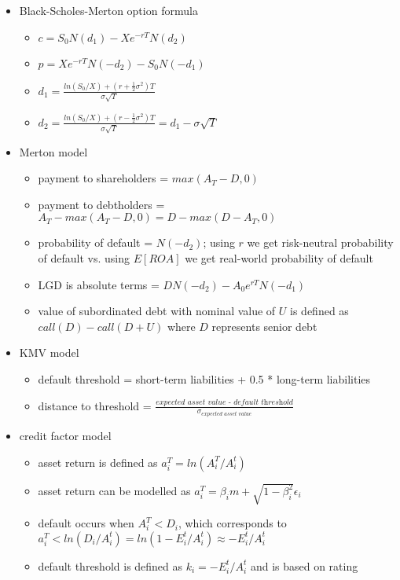 \begin{itemize}
	\item Black-Scholes-Merton option formula
	\begin{itemize}
		\item $c = S_0 N(d_1) - Xe^{-rT} N(d_2)$
		\item $p = Xe^{-rT}N(-d_2) - S_0 N(-d_1)$
		\item $d_1 = \frac{ln(S_0/X) + (r + \frac{1}{2}\sigma^2)T}{\sigma \sqrt{T}}$
		\item $d_2 = \frac{ln(S_0/X) + (r - \frac{1}{2}\sigma^2)T}{\sigma \sqrt{T}} = d_1 - \sigma \sqrt{T}$
	\end{itemize}
	\item Merton model
	\begin{itemize}
		\item payment to shareholders = $max(A_T - D, 0)$
		\item payment to debtholders = $A_T - max(A_T - D, 0) = D - max(D - A_T, 0)$
		\item probability of default = $N(-d_2)$; using $r$ we get risk-neutral probability of default vs. using $E[ROA]$ we get real-world probability of default
		\item LGD is absolute terms = $D N(-d_2) - A_0 e^{rT}N(-d_1)$
		\item value of subordinated debt with nominal value of $U$ is defined as $call(D) - call(D + U)$ where $D$ represents senior debt
	\end{itemize}
	\item KMV model
	\begin{itemize}
		\item default threshold = short-term liabilities + 0.5 * long-term liabilities
		\item distance to threshold = $\frac{\textit{expected asset value  - default threshold}}{\sigma_{\textit{expected asset value}}}$
	\end{itemize}
	\item credit factor model
	\begin{itemize}
		\item asset return is defined as $a_i^T = ln(A_i^T / A_i^t)$
		\item asset return can be modelled as $a_i^T = \beta_i m + \sqrt{1 - \beta_i^2}\epsilon_i$
		\item default occurs when $A_i^T < D_i$, which corresponds to $a_i^T < ln(D_i / A_i^t) = ln(1 - E_i^t / A_i^t) \approx - E_i^t / A_i^t$
		\item default threshold is defined as $k_i = -E_i^t / A_i^t$ and is based on rating

\end{itemize}
\end{itemize}
